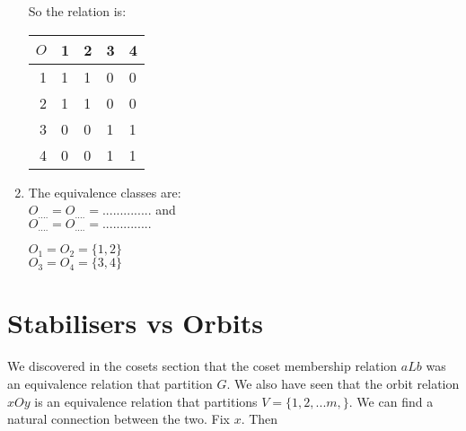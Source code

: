 \begin{example}
\begin{enumerate}
So the relation is:


\begin{tabular}{|r|l|l|l|l|}
  \hline
   $O$ & 1 & 2 & 3 & 4 \\
    \hline
  1 & 1 & 1 & 0 & 0 \\
  2 & 1 & 1 & 0 & 0 \\
  3 & 0 & 0 & 1 & 1 \\
  4 & 0 & 0 & 1 & 1 \\
  \hline
\end{tabular}

\frmrule

\item The equivalence classes are:\\
$O_{....} = O_{....} = ..............$ and \\
$O_{....} = O_{....} = ..............$  

 {$O_1 = O_2 = \{1,2\}$ \\ $O_3 = O_4 = \{3,4\}$}

\end{enumerate}
\end{example}



\section{Stabilisers vs Orbits}





We discovered in the cosets section that the coset membership relation $aLb$ was 
an equivalence relation that partition $G$. We also have seen that the orbit relation 
$xOy$ is an equivalence relation that partitions $V = \{1,2,...m,\}$. We can find a 
natural connection between the two. Fix $x$. Then 



